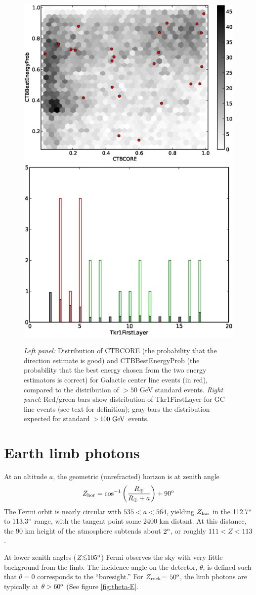 \documentclass[aps,twocolumn,prd,superscriptaddress,showpacs,nofootinbib,fixfloat]{revtex4}
\newcommand{\be}{\begin{equation}}
\newcommand{\ee}{\end{equation}}
\newcommand{\GeV}{{\rm ~GeV}}
\newcommand{\degree}{^{\rm o}}
\newcommand{\zrock}{$Z_{\rm rock}$}
\def\la{\vcenter{\hbox{$<$}\offinterlineskip\hbox{$\sim$}}}
\begin{document}
\begin{figure}
  \centering
  \includegraphics[width=0.48\linewidth]{plots/CTBCORE_CTBBestEnergyProb.eps}
  \includegraphics[width=0.48\linewidth]{plots/Tkr1FirstLayer.eps}
  \caption{\emph{Left panel:} Distribution of CTBCORE (the probability that
  the direction estimate is good) and CTBBestEnergyProb (the probability that
  the best energy chosen from the two energy estimators is correct) for
  Galactic center line events (in red), compared to the distribution of $>50$
  GeV standard events.  \emph{Right panel}: Red/green bars show distribution
  of Tkr1FirstLayer for GC line events (see text for definition); gray bars
  the distribution expected for standard $>100\GeV$ events.}
  \label{fig:CTBquality}
\end{figure}

\clearpage
\section{Earth limb photons}
\label{sec:EarthLimb}
At an altitude $a$, the geometric (unrefracted) horizon is at zenith angle
\be
Z_{\rm hor} = \cos^{-1}\left(\frac{R_\oplus}{R_\oplus+a}\right)+90\degree
\ee
The Fermi orbit is nearly circular with $535 < a < 564$, yielding $Z_{\rm
  hor}$ in the 112.7$\degree$ to 113.3$\degree$ range, with the tangent point
some 2400 km distant.  At this distance, the 90 km height of the atmosphere
subtends about $2\degree$, or roughly $111 < Z < 113$.  

At lower zenith angles ($Z \la 105\degree$) Fermi observes the sky with very
little background from the limb.  The incidence angle on the detector,
$\theta$, is defined such that $\theta=0$ corresponds to the ``boresight.''
For \zrock = $50\degree$, the limb photons are typically at $\theta >
60\degree$ (See figure \ref{fig:theta-E}.
\end{document}
